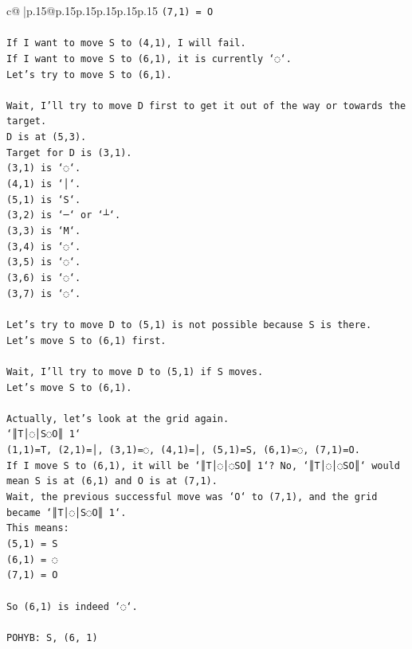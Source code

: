 \documentclass{article}
\begin{document}
{\begin{supertabular}{c@{$\;$}|p{.15\linewidth}@{}p{.15\linewidth}p{.15\linewidth}p{.15\linewidth}p{.15\linewidth}p{.15\linewidth}}
{{{\texttt{(7,1) = O} \\
\\ 
\texttt{If I want to move S to (4,1), I will fail.} \\
\texttt{If I want to move S to (6,1), it is currently `◌`.} \\
\texttt{Let's try to move S to (6,1).} \\
\\ 
\texttt{Wait, I'll try to move D first to get it out of the way or towards the target.} \\
\texttt{D is at (5,3).} \\
\texttt{Target for D is (3,1).} \\
\texttt{(3,1) is `◌`.} \\
\texttt{(4,1) is `│`.} \\
\texttt{(5,1) is `S`.} \\
\texttt{(3,2) is `─` or `┴`.} \\
\texttt{(3,3) is `M`.} \\
\texttt{(3,4) is `◌`.} \\
\texttt{(3,5) is `◌`.} \\
\texttt{(3,6) is `◌`.} \\
\texttt{(3,7) is `◌`.} \\
\\ 
\texttt{Let's try to move D to (5,1) is not possible because S is there.} \\
\texttt{Let's move S to (6,1) first.} \\
\\ 
\texttt{Wait, I'll try to move D to (5,1) if S moves.} \\
\texttt{Let's move S to (6,1).} \\
\\ 
\texttt{Actually, let's look at the grid again.} \\
\texttt{`║T│◌│S◌O║ 1`} \\
\texttt{(1,1)=T, (2,1)=│, (3,1)=◌, (4,1)=│, (5,1)=S, (6,1)=◌, (7,1)=O.} \\
\texttt{If I move S to (6,1), it will be `║T│◌│◌SO║ 1`? No, `║T│◌│◌SO║` would mean S is at (6,1) and O is at (7,1).} \\
\texttt{Wait, the previous successful move was `O` to (7,1), and the grid became `║T│◌│S◌O║ 1`.} \\
\texttt{This means:} \\
\texttt{(5,1) = S} \\
\texttt{(6,1) = ◌} \\
\texttt{(7,1) = O} \\
\\ 
\texttt{So (6,1) is indeed `◌`.} \\
\\ 
\texttt{POHYB: S, (6, 1)} \\
            }
        }
    }
     \\ \\


\end{supertabular}}
\end{document}
